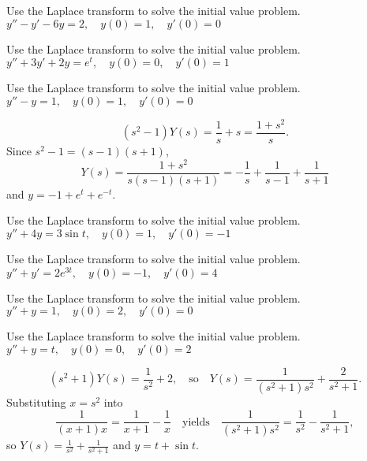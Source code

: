 \documentclass{ximera}
\begin{document}
\begin{problem}\label{exer:8.3.14} Use the Laplace transform to solve the initial value problem. $y''-y'-6y=2, \quad  y(0)=1,\quad y'(0)=0$
\end{problem}

\begin{problem}\label{exer:8.3.15} Use the Laplace transform to solve the initial value problem. $y''+3y'+2y=e^t, \quad  y(0)=0,\quad y'(0)=1$
\end{problem}

\begin{problem}\label{exer:8.3.16} Use the Laplace transform to solve the initial value problem. $y''-y=1, \quad  y(0)=1,\quad y'(0)=0$

\begin{solution}
$$
(s^2-1)Y(s)=\frac{1}{s}+s=\frac{1+s^2}{s}.
$$
Since $s^2-1=(s-1)(s+1)$,
$$
Y(s)=\frac{1+s^2}{s(s-1)(s+1)}=
-\frac{1}{s}+\frac{1}{s-1}+\frac{1}{s+1}
$$
and
 $y=-1+e^t+e^{-t}$.
\end{solution}
\end{problem}

\begin{problem}\label{exer:8.3.17} Use the Laplace transform to solve the initial value problem. $y''+4y=3\sin t, \quad  y(0)=1,\quad y'(0)=-1$
\end{problem}

\begin{problem}\label{exer:8.3.18} Use the Laplace transform to solve the initial value problem. $y''+y'=2e^{3t}, \quad  y(0)=-1,\quad y'(0)=4$
\end{problem}

\begin{problem}\label{exer:8.3.19} Use the Laplace transform to solve the initial value problem. $y''+y=1, \quad  y(0)=2,\quad y'(0)=0$
\end{problem}

\begin{problem}\label{exer:8.3.20} Use the Laplace transform to solve the initial value problem. $y''+y=t, \quad  y(0)=0,\quad y'(0)=2$

\begin{solution}
$$
(s^2+1)Y(s)=\frac{1}{s^2}+2,\quad \mbox{so}\quad
Y(s)=\frac{1}{(s^2+1)s^2}+\frac{2}{s^2+1}.
$$
Substituting $x=s^2$ into
$$
\frac{1}{(x+1)x}=\frac{1}{x+1}-\frac{1}{x}
\quad \mbox{yields}\quad
\frac{1}{(s^2+1)s^2}=\frac{1}{s^2}-\frac{1}{s^2+1},
$$
so $Y(s)=\frac{1}{s^2}+\frac{1}{s^2+1}$ and $y=t+\sin t$.
\end{solution}
\end{problem}
\end{document}
